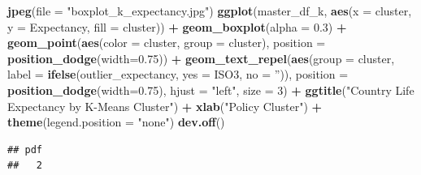 \documentclass[]{article}
\newenvironment{Shaded}{\begin{snugshade}}{\end{snugshade}}
\newcommand{\DataTypeTok}[1]{\textcolor[rgb]{0.13,0.29,0.53}{#1}}
\newcommand{\DecValTok}[1]{\textcolor[rgb]{0.00,0.00,0.81}{#1}}
\newcommand{\FloatTok}[1]{\textcolor[rgb]{0.00,0.00,0.81}{#1}}
\newcommand{\KeywordTok}[1]{\textcolor[rgb]{0.13,0.29,0.53}{\textbf{#1}}}
\newcommand{\NormalTok}[1]{#1}
\newcommand{\OperatorTok}[1]{\textcolor[rgb]{0.81,0.36,0.00}{\textbf{#1}}}
\newcommand{\StringTok}[1]{\textcolor[rgb]{0.31,0.60,0.02}{#1}}
\begin{document}
\begin{Shaded}
\begin{Highlighting}[]
\KeywordTok{jpeg}\NormalTok{(}\DataTypeTok{file =} \StringTok{"boxplot_k_expectancy.jpg"}\NormalTok{)}
\KeywordTok{ggplot}\NormalTok{(master_df_k, }
       \KeywordTok{aes}\NormalTok{(}\DataTypeTok{x =}\NormalTok{ cluster, }\DataTypeTok{y =}\NormalTok{ Expectancy, }\DataTypeTok{fill =}\NormalTok{ cluster)) }\OperatorTok{+}
\StringTok{  }\KeywordTok{geom_boxplot}\NormalTok{(}\DataTypeTok{alpha =} \FloatTok{0.3}\NormalTok{) }\OperatorTok{+}
\StringTok{  }\KeywordTok{geom_point}\NormalTok{(}\KeywordTok{aes}\NormalTok{(}\DataTypeTok{color =}\NormalTok{ cluster, }\DataTypeTok{group =}\NormalTok{ cluster), }\DataTypeTok{position =} \KeywordTok{position_dodge}\NormalTok{(}\DataTypeTok{width=}\FloatTok{0.75}\NormalTok{)) }\OperatorTok{+}
\StringTok{  }\KeywordTok{geom_text_repel}\NormalTok{(}\KeywordTok{aes}\NormalTok{(}\DataTypeTok{group =}\NormalTok{ cluster, }
                \DataTypeTok{label =} \KeywordTok{ifelse}\NormalTok{(outlier_expectancy, }
                  \DataTypeTok{yes =}\NormalTok{ ISO3,}
                  \DataTypeTok{no =} \StringTok{''}\NormalTok{)), }
            \DataTypeTok{position =} \KeywordTok{position_dodge}\NormalTok{(}\DataTypeTok{width=}\FloatTok{0.75}\NormalTok{),}
            \DataTypeTok{hjust =} \StringTok{"left"}\NormalTok{, }\DataTypeTok{size =} \DecValTok{3}\NormalTok{) }\OperatorTok{+}\StringTok{ }\KeywordTok{ggtitle}\NormalTok{(}\StringTok{"Country Life Expectancy by K-Means Cluster"}\NormalTok{) }\OperatorTok{+}\StringTok{ }
\StringTok{  }\KeywordTok{xlab}\NormalTok{(}\StringTok{"Policy Cluster"}\NormalTok{) }\OperatorTok{+}\StringTok{ }\KeywordTok{theme}\NormalTok{(}\DataTypeTok{legend.position =} \StringTok{"none"}\NormalTok{)}
\KeywordTok{dev.off}\NormalTok{()}
\end{Highlighting}
\end{Shaded}

\begin{verbatim}
## pdf 
##   2
\end{verbatim}
\end{document}
